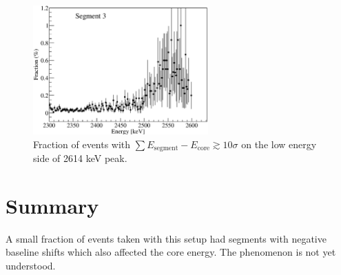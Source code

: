 \begin{figure}[tphb]
\centering
\includegraphics[width=0.6\textwidth]{NegFraction2614}
\caption{Fraction of events with $\sum E_{\text{segment}} -
E_{\text{core}} \gtrsim 10\sigma$ on the low energy side of 2614 keV
peak.}
\label{fig:np:frac2614}
\end{figure}

\section{Summary}
\label{sec:np:sum}
A small fraction of events taken with this setup had segments with
negative baseline shifts which also affected the core energy. The
phenomenon is not yet understood.


